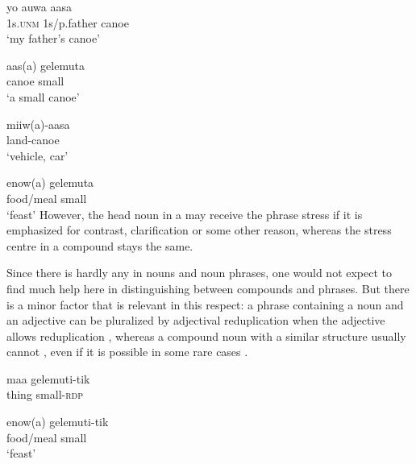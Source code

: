\ea%
\label{ex:3:x29}
\gll yo {\textprimstress}auwa aasa\footnotemark{} \\
1s.\textsc{unm} 1s/p.father canoe\\
\glt`my father's canoe'
\z


\ea%
\label{ex:3:x30}
\gll aas(a) ge{\textprimstress}lemuta \\
canoe small\\
\glt`a small canoe'
\z

\ea%
\label{ex:3:x31}
\gll {\textprimstress}miiw(a)-aasa\footnotemark{} \\
land-canoe\\
\glt`vehicle, car'
\z
{}

\ea%
\label{ex:3:x32}
\gll enow(a) ge{\textprimstress}lemuta{\footnotemark} \\
food/meal small\\
\glt`feast'
\z
{}
However, the head noun in a  may receive the phrase stress if it is emphasized for contrast, clarification or some other reason, whereas the stress centre in a compound stays the same. 

Since there is hardly any  in nouns and noun phrases, one would not expect to find much help here in distinguishing between compounds and phrases. But there is a minor factor that is relevant in this respect: a phrase containing a noun and an adjective can be pluralized by adjectival reduplication when the adjective allows reduplication , whereas a compound noun with a similar structure usually cannot , even if it is possible in some rare cases . 

\ea%
\label{ex:3:x33}
\gll maa gelemuti-tik \\
thing small-\textsc{rdp}\\
\z

\ea%
\label{ex:3:x34}
\gll *enow(a) gelemuti-tik \\
food/meal small\\
\glt `feast'
\z


